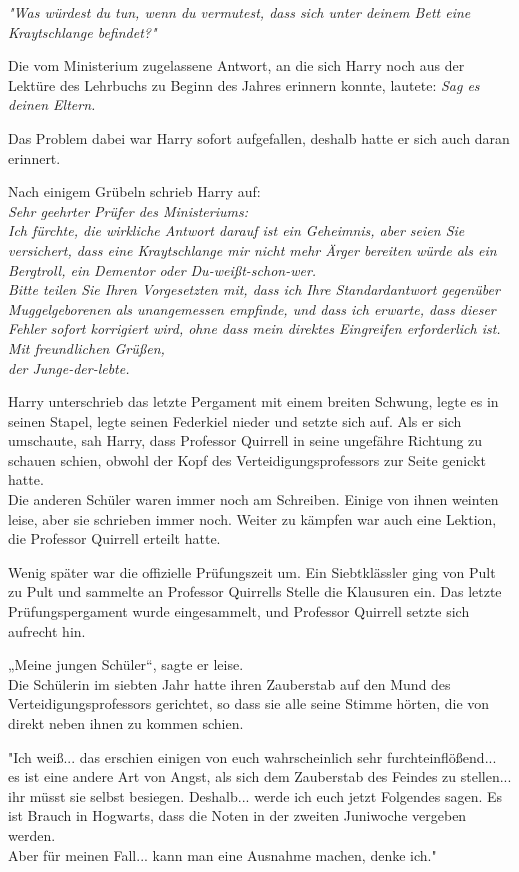 {\emph{"Was würdest du tun, wenn du vermutest, dass sich unter deinem Bett eine Kraytschlange befindet?"}

Die vom Ministerium zugelassene Antwort, an die sich Harry noch aus der Lektüre des Lehrbuchs zu Beginn des Jahres erinnern konnte, lautete: \emph{Sag es deinen Eltern.}

Das Problem dabei war Harry sofort aufgefallen, deshalb hatte er sich auch daran erinnert.

Nach einigem Grübeln schrieb Harry auf:\\ \emph{Sehr geehrter Prüfer des Ministeriums:}\\ \emph{Ich fürchte, die wirkliche Antwort darauf ist ein Geheimnis, aber seien Sie versichert, dass eine Kraytschlange mir nicht mehr Ärger bereiten würde als ein Bergtroll, ein Dementor oder Du-weißt-schon-wer.}\\ \emph{\hfill\break Bitte teilen Sie Ihren Vorgesetzten mit, dass ich Ihre Standardantwort gegenüber} \emph{Muggelgeborenen als unangemessen empfinde, und dass ich erwarte, dass dieser Fehler sofort korrigiert wird, ohne dass mein direktes Eingreifen erforderlich ist.}\\ \emph{\hfill\break Mit freundlichen Grüßen,}\\ \emph{der Junge-der-lebte.}

Harry unterschrieb das letzte Pergament mit einem breiten Schwung, legte es in seinen Stapel, legte seinen Federkiel nieder und setzte sich auf. Als er sich umschaute, sah Harry, dass Professor Quirrell in seine ungefähre Richtung zu schauen schien, obwohl der Kopf des Verteidigungsprofessors zur Seite genickt hatte.\\ Die anderen Schüler waren immer noch am Schreiben. Einige von ihnen weinten leise, aber sie schrieben immer noch. Weiter zu kämpfen war auch eine Lektion, die Professor Quirrell erteilt hatte.

Wenig später war die offizielle Prüfungszeit um. Ein Siebtklässler ging von Pult zu Pult und sammelte an Professor Quirrells Stelle die Klausuren ein. Das letzte Prüfungspergament wurde eingesammelt, und Professor Quirrell setzte sich aufrecht hin.

„Meine jungen Schüler“, sagte er leise.\\ Die Schülerin im siebten Jahr hatte ihren Zauberstab auf den Mund des Verteidigungsprofessors gerichtet, so dass sie alle seine Stimme hörten, die von direkt neben ihnen zu kommen schien.

"Ich weiß... das erschien einigen von euch wahrscheinlich sehr furchteinflößend... es ist eine andere Art von Angst, als sich dem Zauberstab des Feindes zu stellen... ihr müsst sie selbst besiegen. Deshalb... werde ich euch jetzt Folgendes sagen. Es ist Brauch in Hogwarts, dass die Noten in der zweiten Juniwoche vergeben werden.\\ Aber für meinen Fall... kann man eine Ausnahme machen, denke ich."

}
